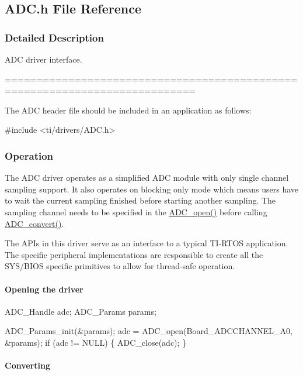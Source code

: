 \subsection{A\+D\+C.\+h File Reference}
\label{_a_d_c_8h}


\subsubsection{Detailed Description}
A\+D\+C driver interface. 

============================================================================

The A\+D\+C header file should be included in an application as follows\+: 
\begin{DoxyCode}
\textcolor{preprocessor}{#include <ti/drivers/ADC.h>}
\end{DoxyCode}


\subsubsection*{Operation}

The A\+D\+C driver operates as a simplified A\+D\+C module with only single channel sampling support. It also operates on blocking only mode which means users have to wait the current sampling finished before starting another sampling. The sampling channel needs to be specified in the \hyperlink{_a_d_c_8h_a9f3e5f311cda4df63e70660651b9314e}{A\+D\+C\+\_\+open()} before calling \hyperlink{_a_d_c_8h_afcac5582b8be42a7740091d150aef05c}{A\+D\+C\+\_\+convert()}.

The A\+P\+Is in this driver serve as an interface to a typical T\+I-\/\+R\+T\+O\+S application. The specific peripheral implementations are responsible to create all the S\+Y\+S/\+B\+I\+O\+S specific primitives to allow for thread-\/safe operation.

\paragraph*{Opening the driver}


\begin{DoxyCode}
ADC_Handle adc;
ADC_Params params;

ADC_Params_init(&params);
adc = ADC_open(Board\_ADCCHANNEL\_A0, &params);
\textcolor{keywordflow}{if} (adc != NULL) \{
    ADC_close(adc);
\}
\end{DoxyCode}


\paragraph*{Converting}


